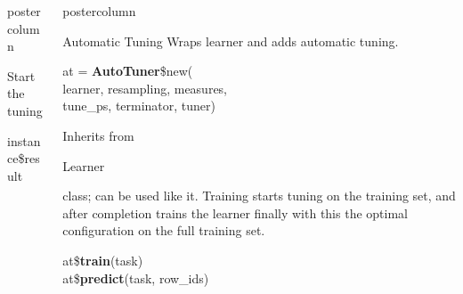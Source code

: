 \documentclass{beamer}
\newlength{\columnheight} %
\newcommand{\codeinline}[1]{\begin{codeboxinline}#1\end{codeboxinline}}
\begin{document}
\begin{frame}[fragile]{}
\begin{columns}
\begin{column}{.245\textwidth}
\begin{beamercolorbox}[center]{postercolumn}
\begin{minipage}{.98\textwidth}
{\begin{myblock}{Start the tuning}
\begin{codeboxexample}
{									instance\$result
								}
							\end{codeboxexample}
						\end{myblock}
						\vfill}
				\end{minipage}
			\end{beamercolorbox}
		\end{column}
		\begin{column}{.245\textwidth}
			\begin{beamercolorbox}[center]{postercolumn}
				\begin{minipage}{.98\textwidth}
					\parbox[t][\columnheight]{\textwidth}{
						\begin{myblock}{Automatic Tuning}
							Wraps learner and adds automatic tuning. 
							\\
							\begin{codeboxmultiline}[width=20cm]
								at = \textbf{AutoTuner}\$new(\\
								\hspace*{1ex}learner, resampling, measures, \\
								\hspace*{1ex}tune\_ps, terminator, tuner)
							\end{codeboxmultiline}
							\vspace{1em}
                            Inherits from \codeinline{Learner} class; can be used like it. Training starts tuning on the training set, and after completion trains the learner finally with this the optimal configuration on the full training set.
							\begin{codeboxmultiline}[width=16.5cm]
								at\$\textbf{train}(task)\\
								at\$\textbf{predict}(task, row\_ids)
							\end{codeboxmultiline}

\end{myblock}}
\end{minipage}
\end{beamercolorbox}
\end{column}
\end{columns}
\end{frame}
\end{document}
